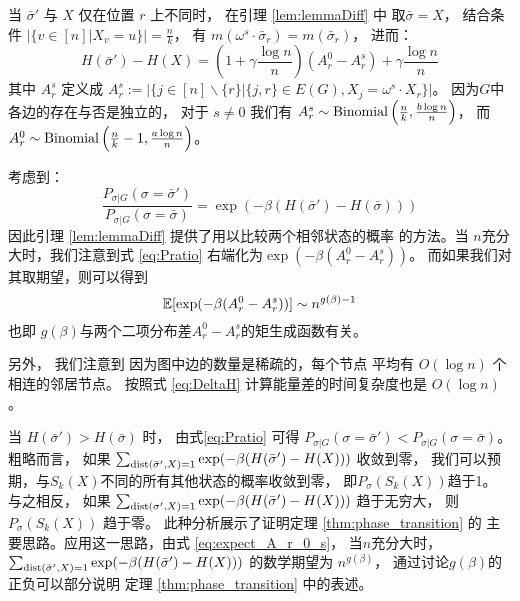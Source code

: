 \begin{remark}\label{re:energy_diff}
	当 $\bar{\sigma}'$ 与 $X$ 仅在位置 $r$
	上不同时， 在引理 \ref{lem:lemmaDiff} 中
	取$\bar{\sigma}=X$，
	结合条件  $|\{v \in [n] | X_v = u\}| = \frac{n}{k}$，
	有 $m(\omega^s \cdot \bar{\sigma}_r)
	=m(\bar{\sigma}_r)$，
	进而：
	\begin{equation}\label{eq:energy_diff}
	H(\bar{\sigma}') - H(X) = \left(1+\gamma \frac{\log n}{n} \right)
	(A^0_r - A^s_r) + \gamma\frac{\log n}{n}
	\end{equation}
	其中 $A^s_r$ 定义成
	$A^s_r := |\{j \in [n]\backslash \{r\} | \{j, r\} \in E(G), X_j = \omega^s \cdot X_r \}|$。
	因为$G$中各边的存在与否是独立的，
	对于 $s\neq 0$
	我们有 $A^s_r \sim \operatorname{Binomial} \left(
	  \frac{n}{k}, \frac{b \log n}{n} \right) $，
	而 $A^0_r \sim \operatorname{Binomial}
	\left(
	  \frac{n}{k}-1, \frac{a \log n}{n} \right)$。	
\end{remark}
考虑到：
\begin{equation}\label{eq:Pratio}
\frac{P_{\sigma |G } (\sigma = \bar{\sigma}')}{P_{\sigma |G } (\sigma = \bar{\sigma})}
= \exp(-\beta(H(\bar{\sigma}') - H(\bar{\sigma})))
\end{equation}
因此引理 \ref{lem:lemmaDiff} 提供了用以比较两个相邻状态的概率
的方法。当 $n$充分大时，我们注意到式
\eqref{eq:Pratio} 右端化为$\exp(-\beta (A_r^0 - A_r^s))$。
而如果我们对其取期望，则可以得到
\begin{equation}\label{eq:expect_A_r_0_s}
	\operatorname{\mathbb{E}}[\exp(-\beta (A_r^0 - A_r^s))] \sim n^{g(\beta)-1}
\end{equation}
也即 $g(\beta)$与两个二项分布差$A_r^0 - A_r^s$的矩生成函数有关。



另外， 我们注意到 因为图中边的数量是稀疏的，每个节点
平均有 $O(\log n)$ 个相连的邻居节点。
按照式 \eqref{eq:DeltaH} 
计算能量差的时间复杂度也是 $O(\log n)$。

当 $H(\bar{\sigma}') > H(\bar{\sigma})$ 时， 
由式\eqref{eq:Pratio} 可得
$P_{\sigma | G}(\sigma = \bar{\sigma}')<P_{\sigma | G}(\sigma = \bar{\sigma})$。
粗略而言， 如果
$ \sum_{\operatorname{dist}(\bar{\sigma}', X)=1}\exp(-\beta(H(\bar{\sigma}') - H(X))) $
收敛到零，
我们可以预期，与$S_k(X)$不同的所有其他状态的概率收敛到零，
即$P_{\sigma}(S_k(X))$趋于1。
与之相反， 如果
$ \sum_{\operatorname{dist}(\sigma', X)=1}\exp(-\beta(H(\bar{\sigma}') - H(X))) $
趋于无穷大，
则 $P_{\sigma}(S_k(X))$ 趋于零。
此种分析展示了证明定理 \ref{thm:phase_transition} 的
主要思路。应用这一思路，由式
\eqref{eq:expect_A_r_0_s}，
当$n$充分大时，$ \sum_{\operatorname{dist}(\bar{\sigma}', X)=1}\exp(-\beta(H(\bar{\sigma}') - H(X))) $
的数学期望为 $n^{g(\beta)}$，
通过讨论$g(\beta)$的正负可以部分说明
定理 \ref{thm:phase_transition} 中的表述。

